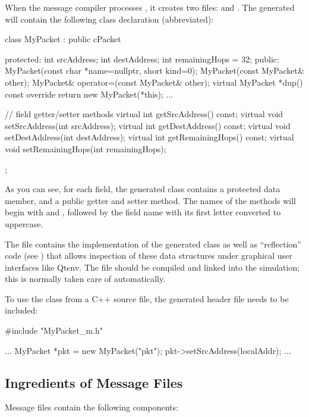 When the message compiler processes , it creates two files:
 and . The generated 
will contain the following class declaration (abbreviated):

\begin{cpp}
class MyPacket : public cPacket {
  protected:
    int srcAddress;
    int destAddress;
    int remainingHops = 32;
  public:
    MyPacket(const char *name=nullptr, short kind=0);
    MyPacket(const MyPacket& other);
    MyPacket& operator=(const MyPacket& other);
    virtual MyPacket *dup() const override {return new MyPacket(*this);}
    ...

    // field getter/setter methods
    virtual int getSrcAddress() const;
    virtual void setSrcAddress(int srcAddress);
    virtual int getDestAddress() const;
    virtual void setDestAddress(int destAddress);
    virtual int getRemainingHops() const;
    virtual void setRemainingHops(int remainingHops);
};
\end{cpp}

As you can see, for each field, the generated class contains a protected data
member, and a public getter and setter method. The names of the methods will
begin with  and , followed by the field name with its first
letter converted to uppercase.

The  file contains the implementation of the generated
 class as well as ``reflection'' code (see
) that allows inspection of these data structures under
graphical user interfaces like Qtenv. The  file should be
compiled and linked into the simulation; this is normally taken care of
automatically.

To use the  class from a C++ source file, the
generated header file needs to be included:

\begin{cpp}
#include "MyPacket_m.h"

...
MyPacket *pkt = new MyPacket("pkt");
pkt->setSrcAddress(localAddr);
...
\end{cpp}


\subsection{Ingredients of Message Files}
\label{sec:msg-defs:ingredients}

Message files contain the following components:


